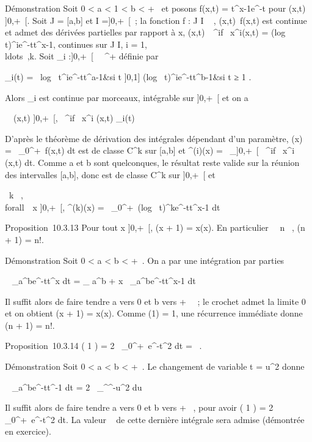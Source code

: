 \documentclass[]{article}
\begin{document}
Démonstration Soit 0 < a < 1 < b
< +\infty~ et posons f(x,t) = t^x-1e^-t pour
(x,t) \in [a,b]\times]0,+\infty~[. Soit J = [a,b] et I =]0,+\infty~[~; la
fonction f : J \times I \rightarrow~ , (x,t)\mapsto~f(x,t) est
continue et admet des dérivées partielles par rapport à x,
(x,t)\mapsto~\partial~^if\over
\partial~x^i(x,t) = (log~
t)^ie^-tt^x-1, continues sur J \times I, i =
1,\\ldots~,k. Soit
\phi_i :]0,+\infty~[\rightarrow~ ~^+ définie par

 \phi_i(t) = \left \
\cases log~
t^ie^-tt^a-1&si t \in]0,1]
\cr (log~
t)^ie^-tt^b-1&si t ≥ 1 
\right .

Alors \phi_i est continue par morceaux, intégrable sur ]0,+\infty~[
et on a

\forall~~(x,t) \in [a,b]\times]0,+\infty~[, 
\partial~^if \over \partial~x^i (x,t)\leq
\phi_i(t)

D'après le théorème de dérivation des intégrales dépendant d'un
paramètre, \Gamma(x) =\int ~
_0^+\infty~f(x,t) dt est de classe C^k sur [a,b]
et \Gamma^(i)(x) =\int ~
_]0,+\infty~[ \partial~^if \over
\partial~x^i (x,t) dt. Comme a et b sont quelconques, le résultat
reste valide sur la réunion des intervalles [a,b], donc \Gamma est de
classe C^k sur ]0,+\infty~[ et

\forall~k \in {}~, \\forall~~x
\in]0,+\infty~[, \Gamma^(k)(x) =\int ~
_0^+\infty~(log~
t)^ke^-tt^x-1 dt

Proposition~10.3.13 Pour tout x \in]0,+\infty~[, \Gamma(x + 1) = x\Gamma(x). En
particulier \forall~~n \in \mathbb{N}~, \Gamma(n + 1) = n!.

Démonstration Soit 0 < a < b < +\infty~. On a
par une intégration par parties

\int ~
_a^be^-tt^x dt =
\left
[-e^-tt^x\right ]_
a^b + x\int ~
_a^be^-tt^x-1 dt

Il suffit alors de faire tendre a vers 0 et b vers + \infty~~; le crochet
admet la limite 0 et on obtient \Gamma(x + 1) = x\Gamma(x). Comme \Gamma(1) = 1, une
récurrence immédiate donne \Gamma(n + 1) = n!.

Proposition~10.3.14 \Gamma( 1  ) =
2\int ~
_0^+\infty~e^-t^2  dt =
\sqrt\pi~.

Démonstration Soit 0 < a < b < +\infty~. Le
changement de variable t = u^2 donne

\int ~
_a^be^-tt^-1 dt =
2\int ~
_\sqrta^\sqrtbe^-u^2
 du

Il suffit alors de faire tendre a vers 0 et b vers + \infty~, pour avoir \Gamma(
1  ) = 2\int ~
_0^+\infty~e^-t^2  dt. La valeur 
\sqrt\pi~ \over 2 de cette dernière
intégrale sera admise (démontrée en exercice).
\end{document}
